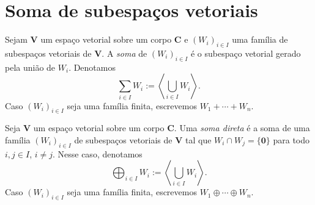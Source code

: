 \section{Soma de subespaços vetoriais}

\begin{definition}
	Sejam $\bm V$ um espaço vetorial sobre um corpo $\bm C$ e $(W_i)_{i \in I}$ uma família de subespaços vetoriais de $\bm V$. A \emph{soma} de $(W_i)_{i \in I}$ é o subespaço vetorial gerado pela união de $W_i$. Denotamos
	\begin{equation*}
	\sum_{i \in I} W_i := \left\langle \bigcup_{i \in I} W_i \right\rangle.
	\end{equation*}
Caso $(W_i)_{i \in I}$ seja uma família finita, escrevemos $W_1 + \cdots + W_n$.
\end{definition}

\begin{definition}
	Seja $\bm V$ um espaço vetorial sobre um corpo $\bm C$. Uma \emph{soma direta} é a soma de uma família $(W_i)_{i \in I}$ de subespaços vetoriais de $\bm V$ tal que $W_i \cap W_j = \{\bm 0\}$ para todo $i,j \in I$, $i \neq j$. Nesse caso, denotamos
	\begin{equation*}
	\bigoplus_{i \in I} W_i := \left\langle \bigcup_{i \in I} W_i\right\rangle.
	\end{equation*}
Caso $(W_i)_{i \in I}$ seja uma família finita, escrevemos $W_1 \oplus \cdots \oplus W_n$.
\end{definition}

